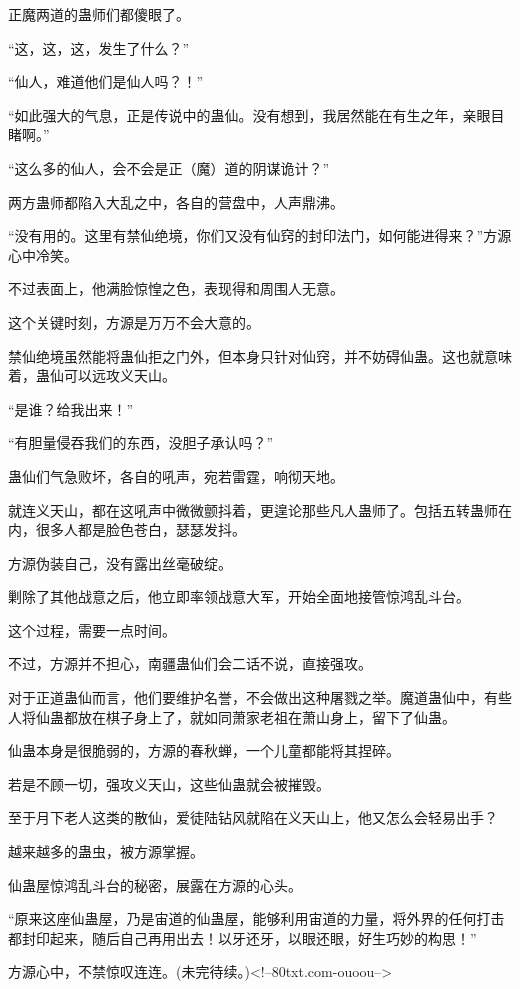 \begin{this_body}
正魔两道的蛊师们都傻眼了。

“这，这，这，发生了什么？”

“仙人，难道他们是仙人吗？！”

“如此强大的气息，正是传说中的蛊仙。没有想到，我居然能在有生之年，亲眼目睹啊。”

“这么多的仙人，会不会是正（魔）道的阴谋诡计？”

两方蛊师都陷入大乱之中，各自的营盘中，人声鼎沸。

“没有用的。这里有禁仙绝境，你们又没有仙窍的封印法门，如何能进得来？”方源心中冷笑。

不过表面上，他满脸惊惶之色，表现得和周围人无意。

这个关键时刻，方源是万万不会大意的。

禁仙绝境虽然能将蛊仙拒之门外，但本身只针对仙窍，并不妨碍仙蛊。这也就意味着，蛊仙可以远攻义天山。

“是谁？给我出来！”

“有胆量侵吞我们的东西，没胆子承认吗？”

蛊仙们气急败坏，各自的吼声，宛若雷霆，响彻天地。

就连义天山，都在这吼声中微微颤抖着，更遑论那些凡人蛊师了。包括五转蛊师在内，很多人都是脸色苍白，瑟瑟发抖。

方源伪装自己，没有露出丝毫破绽。

剿除了其他战意之后，他立即率领战意大军，开始全面地接管惊鸿乱斗台。

这个过程，需要一点时间。

不过，方源并不担心，南疆蛊仙们会二话不说，直接强攻。

对于正道蛊仙而言，他们要维护名誉，不会做出这种屠戮之举。魔道蛊仙中，有些人将仙蛊都放在棋子身上了，就如同萧家老祖在萧山身上，留下了仙蛊。

仙蛊本身是很脆弱的，方源的春秋蝉，一个儿童都能将其捏碎。

若是不顾一切，强攻义天山，这些仙蛊就会被摧毁。

至于月下老人这类的散仙，爱徒陆钻风就陷在义天山上，他又怎么会轻易出手？

越来越多的蛊虫，被方源掌握。

仙蛊屋惊鸿乱斗台的秘密，展露在方源的心头。

“原来这座仙蛊屋，乃是宙道的仙蛊屋，能够利用宙道的力量，将外界的任何打击都封印起来，随后自己再用出去！以牙还牙，以眼还眼，好生巧妙的构思！”

方源心中，不禁惊叹连连。(未完待续。)<!--80txt.com-ouoou-->

\end{this_body}


